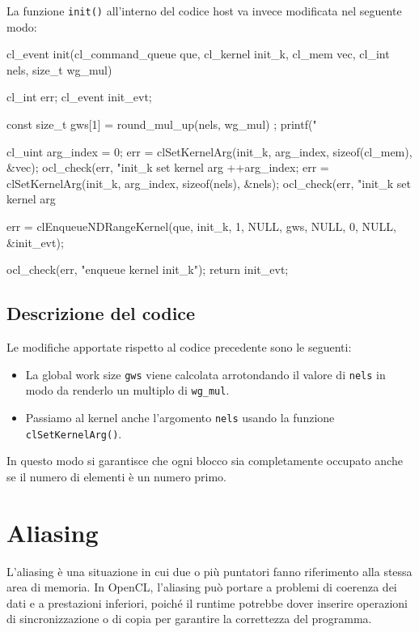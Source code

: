 La funzione \texttt{init()} all'interno del codice host va invece modificata nel seguente modo:
\begin{code}[caption={Scelta della preferred global size - codice host (init)}, label={code:preferred_global_size_host_init}]
    cl_event init(cl_command_queue que, cl_kernel init_k, 
                    cl_mem vec, cl_int nels, size_t wg_mul)
    {
        cl_int err;
        cl_event init_evt;

        const size_t gws[1] = { round_mul_up(nels, wg_mul) };
        printf("%

        cl_uint arg_index = 0;
        err = clSetKernelArg(init_k, arg_index, sizeof(cl_mem), &vec);
        ocl_check(err, "init_k set kernel arg %
        ++arg_index;
        err = clSetKernelArg(init_k, arg_index, sizeof(nels), &nels);
        ocl_check(err, "init_k set kernel arg %

        err = clEnqueueNDRangeKernel(que, init_k, 1, NULL, gws,
            NULL, 0, NULL, &init_evt);

        ocl_check(err, "enqueue kernel init_k");
        return init_evt;
    }
\end{code}

\subsection*{Descrizione del codice}
Le modifiche apportate rispetto al codice precedente sono le seguenti:
\begin{itemize}
    \item La global work size \texttt{gws} viene calcolata arrotondando il valore di \texttt{nels} in modo da renderlo un multiplo di \texttt{wg\_mul}.
    \item Passiamo al kernel anche l'argomento \texttt{nels} usando la funzione \texttt{clSetKernelArg()}.
\end{itemize}

In questo modo si garantisce che ogni blocco sia completamente occupato anche se il numero di elementi è un numero primo.

\section{Aliasing}
L'aliasing è una situazione in cui due o più puntatori fanno riferimento alla stessa area di memoria. In OpenCL, l'aliasing può portare a problemi di coerenza dei dati e a prestazioni inferiori, poiché il runtime potrebbe dover inserire operazioni di sincronizzazione o di copia per garantire la correttezza del programma.

